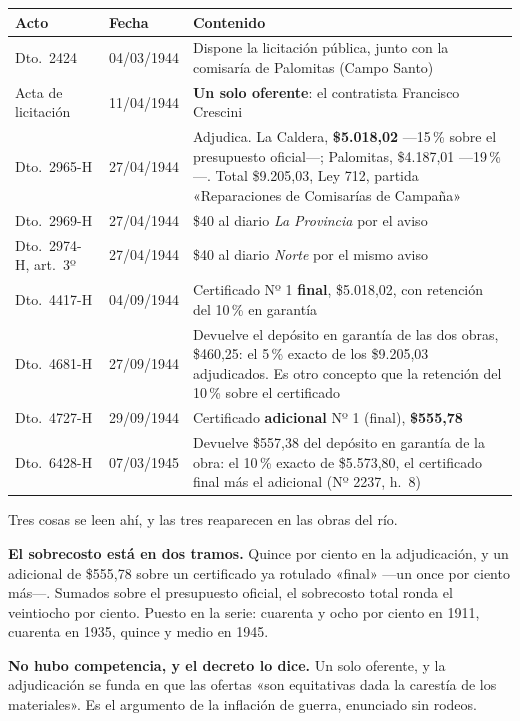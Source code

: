 {\small
\begin{longtable}{@{}p{2.5cm}p{2.0cm}p{7.4cm}@{}}
\toprule
\textbf{Acto} & \textbf{Fecha} & \textbf{Contenido} \\
\midrule
\endhead
Dto.\ 2424 & 04/03/1944 & Dispone la licitación pública, junto con la comisaría de Palomitas (Campo Santo) \\
Acta de licitación & 11/04/1944 & \textbf{Un solo oferente}: el contratista Francisco Crescini \\
Dto.\ 2965-H & 27/04/1944 & Adjudica. La Caldera, \textbf{\$5.018,02} ---15\,\% sobre el presupuesto oficial---; Palomitas, \$4.187,01 ---19\,\%---. Total \$9.205,03, Ley 712, partida «Reparaciones de Comisarías de Campaña» \\
Dto.\ 2969-H & 27/04/1944 & \$40 al diario \textit{La Provincia} por el aviso \\
Dto.\ 2974-H, art.\ 3º & 27/04/1944 & \$40 al diario \textit{Norte} por el mismo aviso \\
Dto.\ 4417-H & 04/09/1944 & Certificado Nº 1 \textbf{final}, \$5.018,02, con retención del 10\,\% en garantía \\
Dto.\ 4681-H & 27/09/1944 & Devuelve el depósito en garantía de las dos obras, \$460,25: el 5\,\% exacto de los \$9.205,03 adjudicados. Es otro concepto que la retención del 10\,\% sobre el certificado \\
Dto.\ 4727-H & 29/09/1944 & Certificado \textbf{adicional} Nº 1 (final), \textbf{\$555,78} \\
Dto.\ 6428-H & 07/03/1945 & Devuelve \$557,38 del depósito en garantía de la obra: el 10\,\% exacto de \$5.573,80, el certificado final más el adicional (Nº 2237, h.\ 8) \\
\bottomrule
\end{longtable}}

Tres cosas se leen ahí, y las tres reaparecen en las obras del río.

\textbf{El sobrecosto está en dos tramos.} Quince por ciento en la adjudicación, y un adicional
de \$555,78 sobre un certificado ya rotulado «final» ---un once por ciento más---. Sumados sobre
el presupuesto oficial, el sobrecosto total ronda el veintiocho por ciento. Puesto en la serie:
cuarenta y ocho por ciento en 1911, cuarenta en 1935, quince y medio en 1945.

\textbf{No hubo competencia, y el decreto lo dice.} Un solo oferente, y la adjudicación se funda
en que las ofertas «son equitativas dada la carestía de los materiales». Es el argumento de la
inflación de guerra, enunciado sin rodeos.

